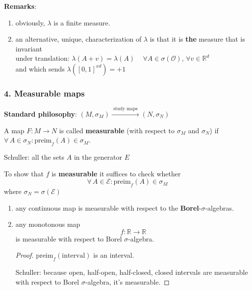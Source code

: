\textbf{Remarks}: 
\begin{enumerate}
	\item[(i)] obviously, $\lambda$ is a finite measure.
	\item[(ii)]  an alternative, unique, characterization of $\lambda$ is that it is \textbf{the} measure that is invariant \\
	under translation: $\lambda(A + v) = \lambda(A) \quad \, \forall A \in \sigma(\mathcal{O}), \, \forall v \in \mathbb{R}^d$ \\
	and which sends $\lambda([0, 1]^{xd}) = +1$
\end{enumerate}

\subsubsection{4. Measurable maps}

\textbf{Standard philosophy}: $(M, \sigma_{M}) \xrightarrow{ \text{ study maps } } (N, \sigma_N)$

\begin{definition}
	A map $F: M \to N$ is called \textbf{measurable} (with respect to $\sigma_M$ and $\sigma_N$) if $\forall \, A \in \sigma_N : \text{preim}_f(A) \in \sigma_M$.
\end{definition}

\begin{lemma}
	Schuller: all the sets $A$ in the generator $E$

	To show that $f$ is \textbf{measurable} it suffices to check whether
	\[
	\forall \, A \in \mathcal{E}: \text{preim}_f(A) \in \sigma_M
	\]
	where $\sigma_N = \sigma(\mathcal{E})$
\end{lemma}

\begin{corollary}
	\begin{enumerate}
		\item[(i)] any continuous map is measurable with respect to the \textbf{Borel}-$\sigma$-algebras.
		\item[(ii)] any monotonous map
		\[
		f:\mathbb{R} \to \mathbb{R}
		\]
		is measurable with respect to Borel $\sigma$-algebra.
		\begin{proof}
			$\text{preim}_f(\text{interval})$ is an interval.
			
			Schuller: because open, half-open, half-closed, closed intervals are measurable with respect to Borel $\sigma$-algebra, it's measurable.
		\end{proof}
	\end{enumerate}
\end{corollary}

